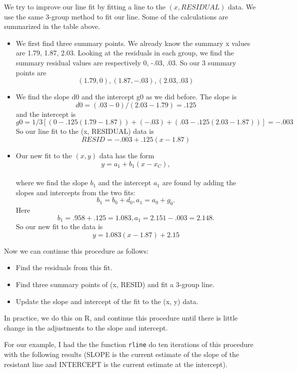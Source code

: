 \documentclass[
]{book}
\providecommand{\tightlist}{%
  \setlength{\itemsep}{0pt}\setlength{\parskip}{0pt}}
\begin{document}
We try to improve our line fit by fitting a line to the \((x, RESIDUAL)\) data. We use the same 3-group method to fit our line. Some of the calculations are summarized in the table above.

\begin{itemize}
\item
  We first find three summary points. We already know the summary x values are 1.79, 1.87, 2.03. Looking at the residuals in each group, we find the summary residual values are respectively 0, -.03, .03. So our 3 summary points are
  \[         
          (1.79, 0), (1.87, -.03), (2.03, .03)
  \]
\item
  We find the slope d0 and the intercept g0 as we did before. The slope is
  \[ d0 = (.03 - 0) / (2.03 - 1.79) = .125\]
  and the intercept is
  \[
  g0 = 1/3[(0 - .125 (1.79 - 1.87)) + (-.03) + (.03 - .125 (2.03 - 1.87))] = -.003
  \]
  So our line fit to the (x, RESIDUAL) data is
  \[          
          RESID = -.003 + .125 (x - 1.87)
  \]
\item
  Our new fit to the \((x, y)\) data has the form
  \[          
          y = a_1 + b_1 (x - x_C),
   \]\\
  where we find the slope \(b_1\) and the intercept \(a_1\) are found by adding the slopes and intercepts from the two fits:
  \[
  b_1 = b_0 + d_0,  a_1 = a_0 + g_0.      
  \]
  Here
  \[ b_1 = .958 + .125 = 1.083, a_1 = 2.151 - .003 = 2.148.\]
  So our new fit to the data is
  \[          
          y = 1.083 (x - 1.87) + 2.15
  \]
\end{itemize}

Now we can continue this procedure as follows:

\begin{itemize}
\tightlist
\item
  Find the residuals from this fit.
\item
  Find three summary points of (x, RESID) and fit a 3-group line.
\item
  Update the slope and intercept of the fit to the (x, y) data.
\end{itemize}

In practice, we do this on R, and continue this procedure until there is little change in the adjustments to the slope and intercept.

For our example, I had the the function \texttt{rline} do ten iterations of this procedure with the following results (SLOPE is the current estimate of the slope of the resistant line and INTERCEPT is the current estimate at the intercept).
\end{document}
